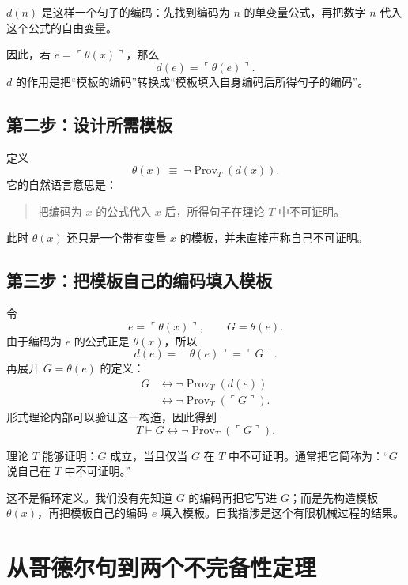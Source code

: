 \documentclass[11pt,a4paper]{article}
\newcommand{\Prov}{\operatorname{Prov}}
\newcommand{\code}[1]{\ulcorner #1\urcorner}
\begin{document}
\begin{plainbox}
$d(n)$ 是这样一个句子的编码：先找到编码为 $n$ 的单变量公式，再把数字 $n$ 代入这个公式的自由变量。
\end{plainbox}

因此，若 $e=\code{\theta(x)}$，那么
\[
 d(e)=\code{\theta(e)}.
\]
$d$ 的作用是把“模板的编码”转换成“模板填入自身编码后所得句子的编码”。

\subsection{第二步：设计所需模板}

定义
\[
 \theta(x)\;\equiv\;\neg\Prov_T(d(x)).
\]
它的自然语言意思是：

\begin{quote}
把编码为 $x$ 的公式代入 $x$ 后，所得句子在理论 $T$ 中不可证明。
\end{quote}

此时 $\theta(x)$ 还只是一个带有变量 $x$ 的模板，并未直接声称自己不可证明。

\subsection{第三步：把模板自己的编码填入模板}

令
\[
 e=\code{\theta(x)},
 \qquad
 G=\theta(e).
\]
由于编码为 $e$ 的公式正是 $\theta(x)$，所以
\[
 d(e)=\code{\theta(e)}=\code{G}.
\]
再展开 $G=\theta(e)$ 的定义：
\[
 \begin{aligned}
 G
 &\leftrightarrow \neg\Prov_T(d(e))\\
 &\leftrightarrow \neg\Prov_T(\code{G}).
 \end{aligned}
\]
形式理论内部可以验证这一构造，因此得到
\[
 \boxed{T\vdash G\leftrightarrow\neg\Prov_T(\code{G}).}
\]

\begin{keybox}[哥德尔句的直觉内容]
理论 $T$ 能够证明：$G$ 成立，当且仅当 $G$ 在 $T$ 中不可证明。通常把它简称为：“$G$ 说自己在 $T$ 中不可证明。”
\end{keybox}

这不是循环定义。我们没有先知道 $G$ 的编码再把它写进 $G$；而是先构造模板 $\theta(x)$，再把模板自己的编码 $e$ 填入模板。自我指涉是这个有限机械过程的结果。


\section{从哥德尔句到两个不完备性定理}
\end{document}

